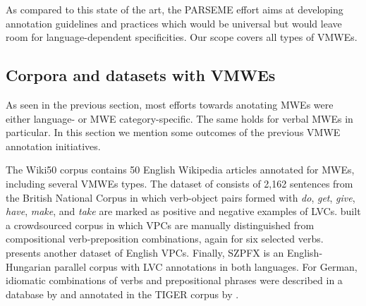 \documentclass[output=paper,
modfonts,
]{langscibook}
\begin{document}
As compared to this state of the art, the PARSEME effort aims at developing annotation guidelines and practices which would be universal but would leave room for language-dependent specificities. Our scope covers all types of VMWEs.





\subsection{Corpora and datasets with VMWEs}
\label{sec:related-datasets}

As seen in the previous section, most efforts towards anotating MWEs were either language- or MWE category-specific. The same holds for verbal MWEs in particular. In this section we mention some outcomes of the previous VMWE annotation initiatives.


The Wiki50 \citep{wiki50} corpus contains 50 English Wi\-ki\-pe\-dia articles annotated for MWEs, including several VMWEs types.  The dataset of \citet{tu-roth:2011:MWE} consists of 2,162 sentences from the British National Corpus in which verb-object pairs formed with \textit{do}, \textit{get}, \textit{give}, \textit{have}, \textit{make}, and \textit{take} are marked as positive and negative examples of LVCs. \citet{Tu:2012} built a crowdsourced corpus in which VPCs are manually distinguished from compositional verb-preposition combinations, again for six selected verbs. \citet{baldwin08} presents another dataset of English VPCs. Finally, SZPFX \citep{paralellfx} is an English-Hungarian parallel corpus with LVC annotations in both languages. 
For German, idiomatic combinations of verbs and prepositional phrases were described in a database by \citet{krenn} and annotated in the TIGER corpus by \citet{Brants2005}.
\end{document}
